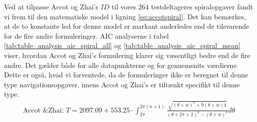 \newpage
Ved at tilpasse Accot og Zhai's $ID$ til vores 264 testdeltageres spiralopgaver fandt vi frem til den matematiske model i ligning \ref{eq:accotspiral}. Det kan bemærkes, at de to konstante led for denne model er markant anderledes end de tilsvarende for de fire andre formuleringer.  AIC analyserne i tabel \ref{tab:table_analysis_aic_spiral_all} og \ref{tab:table_analysis_aic_spiral_mean} viser, hvordan Accot og Zhai's formulering klarer sig væsentligt bedre end de fire andre. Det gælder både for alle datapunkterne og for gennemsnits værdierne. Dette er også, hvad vi forventede, da de formuleringer ikke er beregnet til denne type navigationsopgaver, imens Accot og Zhai's er tiltænkt specifikt til denne type.
\begin{align}
\text{Accot \& Zhai: } T = 2097.09+553.25 \cdot \int_{2\pi}^{2\pi(n+1)}\frac{\sqrt{\left(\theta+w\right)^6+9\left(\theta+w\right)4}}{\left(\theta+2\pi+2\right)^3-\left(\theta+w\right)^3}d\theta
\label{eq:accotspiral}
\end{align}

